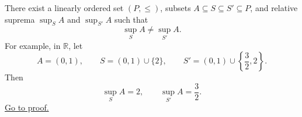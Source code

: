 \begin{proposition}
\label{prop:suprema-ambient-set}
There exist a linearly ordered set $(P,\leq)$, subsets
$A\subseteq S\subseteq S'\subseteq P$, and relative suprema $\sup_S A$ and
$\sup_{S'}A$ such that
\[
  \sup_S A\ne\sup_{S'}A.
\]
For example, in $\mathbb{R}$, let
\[
  A=(0,1),\qquad
  S=(0,1)\cup\{2\},
  \qquad
  S'=(0,1)\cup\left\{\frac{3}{2},2\right\}.
\]
Then
\[
  \sup_S A=2,
  \qquad
  \sup_{S'}A=\frac{3}{2}.
\]
\hyperref[prf:suprema-ambient-set]{Go to proof.}
\end{proposition}